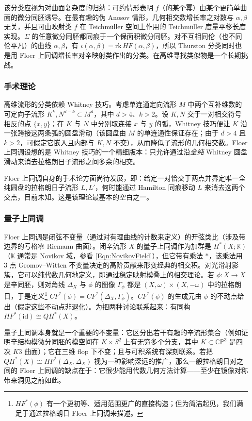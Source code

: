 \documentclass[11pt,a4paper]{article}
\numberwithin{equation}{section}
\newcommand{\bC}{\mathbb{C}}
\newcommand{\bP}{\mathbb{P}}
\newcommand{\bK}{\mathbb{K}}
\newcommand{\id}{\mathrm{id}}
\begin{document}
该分类应视为对曲面复杂度的归纳：可约情形表明 $f$（的某个幂）由某个更简单曲面的微分同胚诱导。在最有趣的伪 Anosov 情形，几何相交数增长率之对数与 $\alpha,\beta$ 无关，并且可由映射类 $f$ 在 Teichm\"uller 空间上作用的 Teichm\"uller 度量平移长度实现。$\Sigma$ 的任意微分同胚都同痕于一个保面积微分同胚。对不互相同伦（也不同伦平凡）的曲线 $\alpha, \beta$，有 $\iota(\alpha,\beta) = \mathrm{rk}\, HF(\alpha,\beta)$，所以 Thurston 分类同时也是用 Floer 上同调增长率对辛映射类作出的分类。在高维寻找类似物是一个长期挑战。

\subsubsection{手术理论} 高维流形的分类依赖 Whitney 技巧。考虑单连通定向流形 $M$ 中两个互补维数的可定向子流形 $K^k, N^{d-k} \subset M^d$，其中 $d>4$、$k>2$。设 $K,N$ 交于一对相交符号相反的点 $\{x,y\}$；在 $K$ 与 $N$ 中分别取连接 $x$ 与 $y$ 的弧，Whitney 技巧便让 $K$ 沿一张跨接这两条弧的圆盘滑动（该圆盘由 $M$ 的单连通性保证存在；由于 $d > 4$ 且 $k>2$，可假定它嵌入且内部与 $K,N$ 不交），从而降低子流形的几何相交数。Floer 上同调设想的是 Whitney 技巧的一个精细版本：只允许通过沿\emph{全纯} Whitney 圆盘滑动来消去拉格朗日子流形之间多余的相交。

Floer 上同调自身的手术论方面尚待发展，即：给定一对恰交于两点并界定唯一全纯圆盘的拉格朗日子流形 $L, L'$，何时能通过 Hamilton 同痕移动 $L$ 来消去这两个交点，目前未知。这是该理论最基本的空白之一。

\subsubsection{量子上同调} Floer 上同调是闭弦不变量（通过对有理曲线的计数来定义）的开弦类比（涉及带边界的亏格零 Riemann 曲面）。闭辛流形 $X$ 的量子上同调作为加群是 $H^*(X;\bK)$（$\bK$ 通常是 Novikov 域，参看 \eqref{Eqn:NovikovField}），但它带有乘法 $\ast$，该乘法用 3 点 Gromov–Witten 不变量决定的高阶贡献来形变经典的相交积。对光滑射影簇，它可以纯代数几何地定义，即通过稳定映射模叠上的相交理论。若 $\phi: X\rightarrow X$ 是辛同胚，则对角线 $\Delta_X$ 与 $\phi$ 的图像 $\Gamma_{\phi}$ 都是 $(X,\omega) \times (X,-\omega)$ 中的拉格朗日，于是定义\footnote{$HF^*(\phi)$ 有一个更初等、适用范围更广的直接构造；但为简洁起见，我们满足于通过拉格朗日 Floer 上同调来描述。} $CF^*(\phi) = CF^*(\Delta_X, \Gamma_{\phi})$。$CF^*(\phi)$ 的生成元由 $\phi$ 的不动点给出（假定这些不动点非退化）。为把两种讨论联系起来：有同构 $HF^*(\id) \cong QH^*(X)$。

量子上同调本身就是一个重要的不变量：它区分出若干有趣的辛流形集合（例如证明辛结构模微分同胚的模空间在 $K \times S^2$ 上有无穷多个分支，其中 $K \subset \bC\bP^3$ 是四次 $K3$ 曲面）；它在三维 flop 下不变；且与可积系统有深刻联系。若把 $QH^*(X) \cong HF^*(\Delta_X, \Delta_X)$ 视为一种影响深远的推广，那么一般拉格朗日对之间的 Floer 上同调的缺点在于：它很少能用代数几何方法计算——至少在镜像对称带来洞见之前如此。
\end{document}
